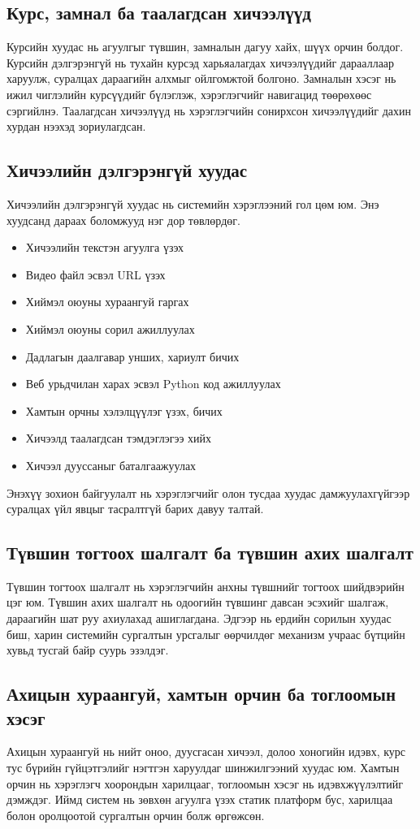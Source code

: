 \subsection{Курс, замнал ба таалагдсан хичээлүүд}
Курсийн хуудас нь агуулгыг түвшин, замналын дагуу хайх, шүүх орчин болдог. Курсийн дэлгэрэнгүй нь тухайн курсэд харьяалагдах хичээлүүдийг дарааллаар харуулж, суралцах дараагийн алхмыг ойлгомжтой болгоно. Замналын хэсэг нь ижил чиглэлийн курсүүдийг бүлэглэж, хэрэглэгчийг навигацид төөрөхөөс сэргийлнэ. Таалагдсан хичээлүүд нь хэрэглэгчийн сонирхсон хичээлүүдийг дахин хурдан нээхэд зориулагдсан.

\subsection{Хичээлийн дэлгэрэнгүй хуудас}
Хичээлийн дэлгэрэнгүй хуудас нь системийн хэрэглээний гол цөм юм. Энэ хуудсанд дараах боломжууд нэг дор төвлөрдөг.
\begin{itemize}
\item Хичээлийн текстэн агуулга үзэх
\item Видео файл эсвэл URL үзэх
\item Хиймэл оюуны хураангуй гаргах
\item Хиймэл оюуны сорил ажиллуулах
\item Дадлагын даалгавар унших, хариулт бичих
\item Веб урьдчилан харах эсвэл Python код ажиллуулах
\item Хамтын орчны хэлэлцүүлэг үзэх, бичих
\item Хичээлд таалагдсан тэмдэглэгээ хийх
\item Хичээл дууссаныг баталгаажуулах
\end{itemize}

Энэхүү зохион байгуулалт нь хэрэглэгчийг олон тусдаа хуудас дамжуулахгүйгээр суралцах үйл явцыг тасралтгүй барих давуу талтай.

\subsection{Түвшин тогтоох шалгалт ба түвшин ахих шалгалт}
Түвшин тогтоох шалгалт нь хэрэглэгчийн анхны түвшнийг тогтоох шийдвэрийн цэг юм. Түвшин ахих шалгалт нь одоогийн түвшинг давсан эсэхийг шалгаж, дараагийн шат руу ахиулахад ашиглагдана. Эдгээр нь ердийн сорилын хуудас биш, харин системийн сургалтын урсгалыг өөрчилдөг механизм учраас бүтцийн хувьд тусгай байр суурь эзэлдэг.

\subsection{Ахицын хураангуй, хамтын орчин ба тоглоомын хэсэг}
Ахицын хураангуй нь нийт оноо, дуусгасан хичээл, долоо хоногийн идэвх, курс тус бүрийн гүйцэтгэлийг нэгтгэн харуулдаг шинжилгээний хуудас юм. Хамтын орчин нь хэрэглэгч хоорондын харилцааг, тоглоомын хэсэг нь идэвхжүүлэлтийг дэмждэг. Иймд систем нь зөвхөн агуулга үзэх статик платформ бус, харилцаа болон оролцоотой сургалтын орчин болж өргөжсөн.

